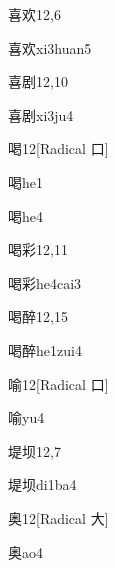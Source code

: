 \begin{entry}{喜欢}{12,6}
  \begin{phonetics}{喜欢}{xi3huan5}
  \end{phonetics}
\end{entry}

\begin{entry}{喜剧}{12,10}
  \begin{phonetics}{喜剧}{xi3ju4}
  \end{phonetics}
\end{entry}

\begin{entry}{喝}{12}[Radical 口]
  \begin{phonetics}{喝}{he1}
  \end{phonetics}
  \begin{phonetics}{喝}{he4}
  \end{phonetics}
\end{entry}

\begin{entry}{喝彩}{12,11}
  \begin{phonetics}{喝彩}{he4cai3}
  \end{phonetics}
\end{entry}

\begin{entry}{喝醉}{12,15}
  \begin{phonetics}{喝醉}{he1zui4}
  \end{phonetics}
\end{entry}

\begin{entry}{喻}{12}[Radical 口]
  \begin{phonetics}{喻}{yu4}
  \end{phonetics}
\end{entry}

\begin{entry}{堤坝}{12,7}
  \begin{phonetics}{堤坝}{di1ba4}
  \end{phonetics}
\end{entry}

\begin{entry}{奥}{12}[Radical 大]
  \begin{phonetics}{奥}{ao4}
  \end{phonetics}
\end{entry}

